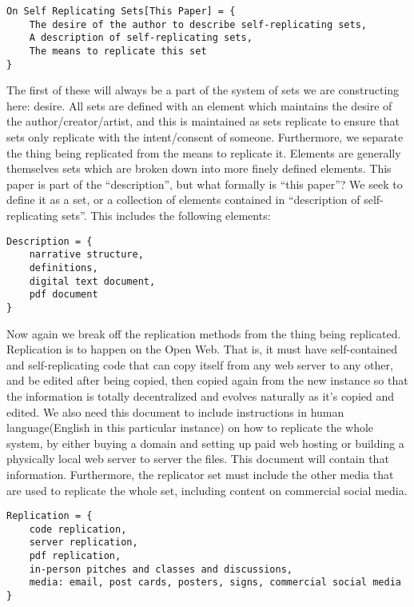 \begin{verbatim}
On Self Replicating Sets[This Paper] = {
    The desire of the author to describe self-replicating sets,
    A description of self-replicating sets,
    The means to replicate this set
}
\end{verbatim}

The first of these will always be a part of the system of sets we are
constructing here: desire. All sets are defined with an element which
maintains the desire of the author/creator/artist, and this is
maintained as sets replicate to ensure that sets only replicate with the
intent/consent of someone. Furthermore, we separate the thing being
replicated from the means to replicate it. Elements are generally
themselves sets which are broken down into more finely defined elements.
This paper is part of the ``description'', but what formally is ``this
paper''? We seek to define it as a set, or a collection of elements
contained in ``description of self-replicating sets''. This includes the
following elements:

\begin{verbatim}
Description = {
    narrative structure,
    definitions,
    digital text document,
    pdf document
}
\end{verbatim}

Now again we break off the replication methods from the thing being
replicated. Replication is to happen on the Open Web. That is, it must
have self-contained and self-replicating code that can copy itself from
any web server to any other, and be edited after being copied, then
copied again from the new instance so that the information is totally
decentralized and evolves naturally as it's copied and edited. We also
need this document to include instructions in human language(English in
this particular instance) on how to replicate the whole system, by
either buying a domain and setting up paid web hosting or building a
physically local web server to server the files. This document will
contain that information. Furthermore, the replicator set must include
the other media that are used to replicate the whole set, including
content on commercial social media.

\begin{verbatim}
Replication = {
    code replication,
    server replication,
    pdf replication,
    in-person pitches and classes and discussions,
    media: email, post cards, posters, signs, commercial social media
}
\end{verbatim}

